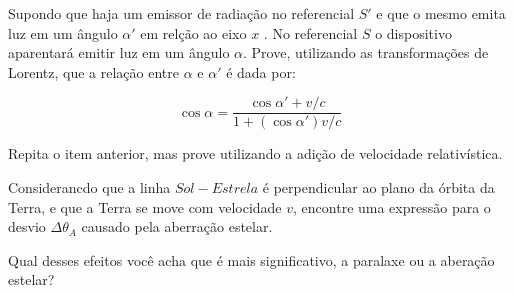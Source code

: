 \documentclass[11pt]{article}
\begin{document}
\begin{pproblem}
\begin{alternativas}
        \item Supondo que haja um emissor de radiação no referencial \(S'\) e que o mesmo emita luz em um ângulo \(\alpha'\) em relção ao eixo \(x\) . No referencial \(S\) o dispositivo aparentará emitir luz em um ângulo \(\alpha\). Prove, utilizando as transformações de Lorentz, que a relação entre \(\alpha\) e \(\alpha'\) é dada por:
        
        \[\cos\alpha = \frac{\cos\alpha' + v/c}{1+(\cos\alpha') v/c}\]

        \item Repita o item anterior, mas prove utilizando a adição de velocidade relativística.

        \item Considerancdo que a linha \(Sol-Estrela\) é perpendicular ao plano da órbita da Terra, e que a Terra se move com velocidade \(v\), encontre uma expressão para o desvio \(\Delta\theta_A\) causado pela aberração estelar.
    
        \item Qual desses efeitos você acha que é mais significativo, a paralaxe ou a aberação estelar?
    \end{alternativas}

    

\end{pproblem}
\end{document}
